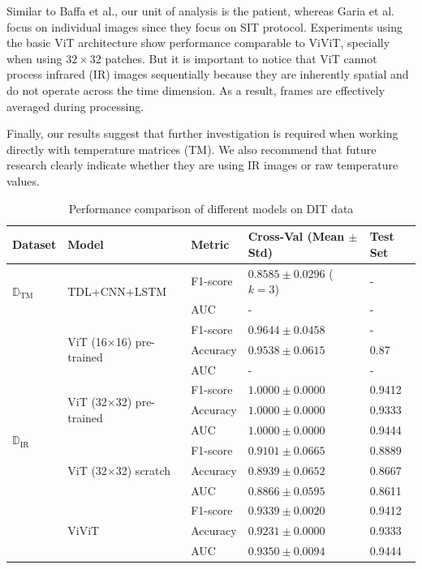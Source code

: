 \documentclass[runningheads]{llncs}
\begin{document}
Similar to Baffa et al., our unit of analysis is the patient, whereas
Garia et al. focus on individual images since they focus on \ac{SIT}
protocol. Experiments using the basic \ac{ViT} architecture show
performance comparable to \ac{ViViT}, specially when using
$32\times 32$ patches. But it is important to notice that \ac{ViT}
cannot process infrared (\ac{IR}) images sequentially because they are
inherently spatial and do not operate across the time dimension. As a
result, frames are effectively averaged during processing.

Finally, our results suggest that further investigation is required
when working directly with temperature matrices (\ac{TM}). We also
recommend that future research clearly indicate whether they are using
\ac{IR} images or raw temperature values.

\begin{table}[h]
  \centering
  \scriptsize
\caption{Performance comparison of different models on \ac{DIT} data}
\label{tab:results}
\begin{tabular}{lllll}
\hline
\textbf{Dataset} & \textbf{Model} & \textbf{Metric} & \textbf{Cross-Val (Mean $\pm$ Std)} & \textbf{Test Set} \\
\hline
\multirow{2}{*}{$\mathbb{D}_{\mathrm{TM}}$} & \multirow{2}{*}{TDL+CNN+LSTM} & F1-score & $0.8585 \pm 0.0296$ ($k=3$) & - \\
 & & AUC & - & - \\
\hline
\multirow{12}{*}{$\mathbb{D}_{\mathrm{IR}}$} & \multirow{3}{*}{ViT (16$\times$16) pre-trained} & F1-score & $0.9644 \pm 0.0458$ & - \\
 & & Accuracy & $0.9538 \pm 0.0615$ & 0.87 \\
 & & AUC & - & - \\
\cline{2-5}
 & \multirow{3}{*}{ViT (32$\times$32) pre-trained} & F1-score & $1.0000 \pm 0.0000$ & 0.9412 \\
 & & Accuracy & $1.0000 \pm 0.0000$ & 0.9333 \\
 & & AUC & $1.0000 \pm 0.0000$ & 0.9444 \\
\cline{2-5}
 & \multirow{3}{*}{ViT (32$\times$32) scratch} & F1-score & $0.9101 \pm 0.0665$ & 0.8889 \\
 & & Accuracy & $0.8939 \pm 0.0652$ & 0.8667 \\
 & & AUC & $0.8866 \pm 0.0595$ & 0.8611 \\
\cline{2-5}
 & \multirow{3}{*}{ViViT} & F1-score & $0.9339 \pm 0.0020$ & 0.9412 \\
 & & Accuracy & $0.9231 \pm 0.0000$ & 0.9333 \\
 & & AUC & $0.9350 \pm 0.0094$ & 0.9444 \\
\hline
\end{tabular}
\end{table}
\end{document}
